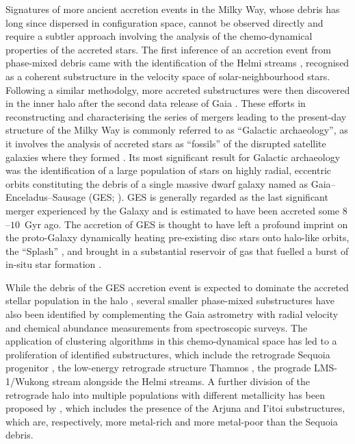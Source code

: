 Signatures of more ancient accretion events in the Milky Way, whose debris has long since dispersed in configuration space, 
cannot be observed directly and require a subtler approach involving the analysis of the chemo-dynamical properties of the accreted stars. 
The first inference of an accretion event from phase-mixed debris came with the identification of the Helmi streams \citep{Helmi1999b}, 
recognised as a coherent substructure in the velocity space of solar-neighbourhood stars. Following a similar methodolgy, more accreted substructures 
were then discovered in the inner halo after the second data release of Gaia \citep[DR2,][]{GaiaCollaboration2018}. These efforts in reconstructing
and characterising the series of mergers leading to the present-day structure of the Milky Way is commonly referred to as ``Galactic archaeology'',
as it involves the analysis of accreted stars as ``fossils'' of the disrupted satellite galaxies where they formed \citep{Helmi2020}.
Its most significant result for Galactic archaeology was the identification of a large population of stars on highly radial, 
eccentric orbits constituting the debris of a single massive dwarf galaxy named as Gaia--Enceladus--Sausage (GES; \citealt{Belokurov2018,Helmi2018}). 
GES is generally regarded as the last significant merger experienced by the Galaxy and is estimated to have been accreted some $8$--$10$~Gyr ago. 
The accretion of GES is thought to have left a profound imprint on the proto-Galaxy  dynamically heating pre-existing disc stars onto halo-like orbits, 
the ``Splash'' \citep{Belokurov2020}, and brought in a substantial reservoir of gas that fuelled a burst of 
in-situ star formation \citep{Bignone2019,Grand2020,Ciucua2024}. 

While the debris of the GES accretion event is expected to dominate the
accreted stellar population in the halo \citep{Naidu2020},
several smaller phase-mixed substructures have also been identified by
complementing the Gaia astrometry with radial velocity
and chemical abundance measurements from spectroscopic surveys.
The application of clustering algorithms in this chemo-dynamical space
has led to a proliferation of identified substructures,
which include the retrograde Sequoia progenitor \citep{Myeong2019}, the
 low-energy retrograde structure Thamnos \citep{Koppelman2019},
the prograde LMS-1/Wukong stream \citep{Yuan2020}
alongside the Helmi streams. A further division of the retrograde halo
into multiple populations with different metallicity
has been proposed by \citet{Naidu2020}, which includes the presence of
the Arjuna and I'itoi substructures,
which are, respectively, more metal-rich and more metal-poor than the
Sequoia debris.

